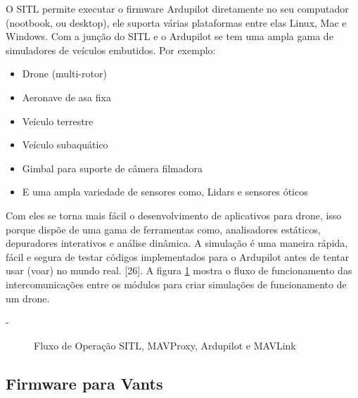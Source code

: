 O SITL permite executar o firmware Ardupilot diretamente no seu computador (nootbook, ou desktop), ele suporta várias plataformas entre elas Linux, Mac e Windows.
Com a junção do SITL e o Ardupilot se tem uma ampla gama de simuladores de veículos embutidos. Por exemplo:
\begin{itemize}
    \item Drone (multi-rotor)
    \item Aeronave de asa fixa
    \item Veículo terrestre
    \item Veículo subaquático
    \item Gimbal para suporte de câmera filmadora
    \item E uma ampla variedade de sensores como, Lidars e sensores óticos
\end{itemize}

Com eles se torna mais fácil o desenvolvimento de aplicativos para drone, isso porque dispõe de uma gama de ferramentas como, analisadores estáticos, depuradores interativos e análise dinâmica. A simulação é uma maneira rápida, fácil e segura de testar códigos implementados para o Ardupilot antes de tentar usar (voar) no mundo real. [26]. A figura \ref{fig:ardupilot} mostra o fluxo de funcionamento das intercomunicações entre os módulos para criar simulações de funcionamento de um drone.

-
\begin{figure}[H]
	\centering
	\caption{Fluxo de Operação SITL, MAVProxy, Ardupilot e MAVLink}
	\fontsize{9pt}{12pt}\selectfont
	\color{white}
	\def\svgwidth{15cm}
	
	\label{fig:ardupilot}
\end{figure}

\subsection{Firmware para Vants}

